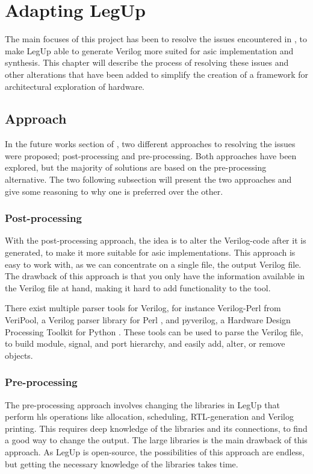 \chapter{\label{chp:adaptinglegup}Adapting LegUp}
The main focuses of this project has been to resolve the issues encountered in \cite{holm2015pro}, to make LegUp able to generate Verilog more suited for \gls{asic} implementation and synthesis. This chapter will describe the process of resolving these issues and other alterations that have been added to simplify the creation of a framework for architectural exploration of hardware.
\section{Approach}
In the future works section of \cite{holm2015pro}, two different approaches to resolving the issues were proposed; post-processing and pre-processing. Both approaches have been explored, but the majority of solutions are based on the pre-processing alternative. The two following subsection will present the two approaches and give some reasoning to why one is preferred over the other.
\subsection{Post-processing}
With the post-processing approach, the idea is to alter the Verilog-code after it is generated, to make it more suitable for \gls{asic} implementations. This approach is easy to work with, as we can concentrate on a single file, the output Verilog file. The drawback of this approach is that you only have the information available in the Verilog file at hand, making it hard to add functionality to the tool.

There exist multiple parser tools for Verilog, for instance Verilog-Perl from VeriPool, a Verilog parser library for Perl \cite{verilogperl}, and pyverilog, a Hardware Design Processing Toolkit for Python \cite{Takamaeda2015Pyverilog}. These tools can be used to parse the Verilog file, to build module, signal, and port hierarchy, and easily add, alter, or remove objects.
\subsection{Pre-processing}
The pre-processing approach involves changing the libraries in LegUp that perform \gls{hls} operations like allocation, scheduling, RTL-generation and Verilog printing. This requires deep knowledge of the libraries and its connections, to find a good way to change the output. The large libraries is the main drawback of this approach. As LegUp is open-source, the possibilities of this approach are endless, but getting the necessary knowledge of the libraries takes time.
